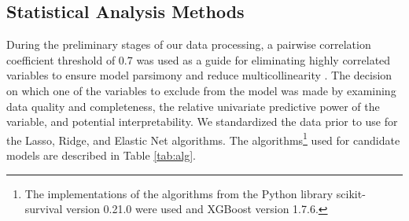 \documentclass{article}
\begin{document}
\subsection{Statistical Analysis Methods}

During the preliminary stages of our data processing, a pairwise correlation coefficient threshold of 0.7 was used as a guide for eliminating highly correlated variables to ensure model parsimony and reduce multicollinearity \cite{Shah2020clinical}.  The decision on which one of the variables to exclude from the model was made by examining data quality and completeness, the relative univariate predictive power of the variable, and potential interpretability. We standardized the data prior to use for the Lasso, Ridge, and Elastic Net algorithms.
The algorithms\footnote{The implementations of the algorithms from the Python library scikit-survival \cite{sksurv} version 0.21.0 were used and XGBoost \cite{xgboost176} version 1.7.6.} used for candidate models are described in Table \ref{tab:alg}.
\end{document}
